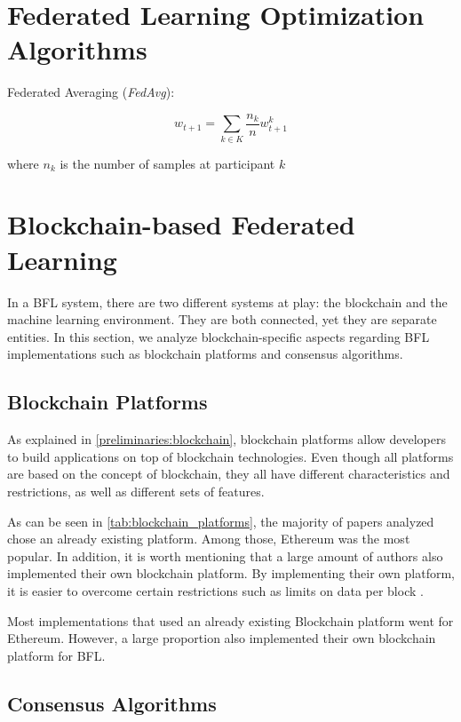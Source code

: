 \section{Federated Learning Optimization Algorithms}

Federated Averaging (\textit{FedAvg}):

\begin{equation}
w_{t+1} = \sum_{k \in K} \frac{n_k}{n} w_{t+1}^k
\end{equation}

where $n_k$ is the number of samples at participant $k$

\section{Blockchain-based Federated Learning}

In a BFL system, there are two different systems at play: the blockchain and the machine learning environment. They are both connected, yet they are separate entities. In this section, we analyze blockchain-specific aspects regarding BFL implementations such as blockchain platforms and consensus algorithms.

\subsection{Blockchain Platforms}

As explained in \autoref{preliminaries:blockchain}, blockchain platforms allow developers to build applications on top of blockchain technologies. Even though all platforms are based on the concept of blockchain, they all have different characteristics and restrictions, as well as different sets of features.

As can be seen in \autoref{tab:blockchain_platforms}, the majority of papers analyzed chose an already existing platform. Among those, Ethereum was the most popular. In addition, it is worth mentioning that a large amount of authors also implemented their own blockchain platform. By implementing their own platform, it is easier to overcome certain restrictions such as limits on data per block \cite{8733825, 9524833}.



 Most implementations that used an already existing Blockchain platform went for Ethereum. However, a large proportion also implemented their own blockchain platform for BFL.

\subsection{Consensus Algorithms}

